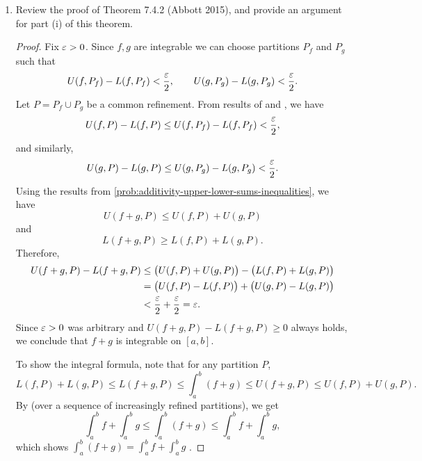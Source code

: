 \begin{problem}
\begin{enumerate}[label=(\alph*)]
    \item Review the proof of Theorem 7.4.2 (Abbott 2015), and provide an argument for part (i) of this theorem.
      
      \begin{proof}
        Fix $\varepsilon > 0$. Since $f, g$ are integrable we can choose partitions $P_{f}$ and $P_{g}$ such that
        \[
          U(f,P_{f})-L(f,P_{f})<\frac{\varepsilon}{2}, \qquad U(g,P_{g})-L(g,P_{g})<\frac{\varepsilon}{2}.
        \]
        Let $P = P_{f} \cup P_{g}$ be a common refinement. From results of
         and , we have
        \[
          U(f,P) - L(f,P) \leq U(f,P_f) - L(f,P_f) < \frac{\varepsilon}{2}, 
        \]
        and similarly,
        \[
          U(g,P) - L(g,P) \leq U(g,P_g) - L(g,P_g) < \frac{\varepsilon}{2}.
        \]
        Using the results from \ref{prob:additivity-upper-lower-sums-inequalities}, we have
        \[
          U(f+g,P) \leq U(f,P) + U(g,P)
        \]
        and
        \[
          L(f+g,P) \geq L(f,P) + L(g,P).
        \]
        Therefore,
        \begin{align*}
          U(f+g,P) - L(f+g,P) &\leq \bigl(U(f,P) + U(g,P)\bigr) - \bigl(L(f,P) + L(g,P)\bigr) \\
          &= \bigl(U(f,P) - L(f,P)\bigr) + \bigl(U(g,P) - L(g,P)\bigr) \\
          &< \frac{\varepsilon}{2} + \frac{\varepsilon}{2} = \varepsilon.
        \end{align*}
        Since $\varepsilon > 0$ was arbitrary and $U(f+g,P) - L(f+g,P) \geq 0$ always holds, 
        we conclude that $f+g$ is integrable on $[a,b]$.
        
        To show the integral formula, note that for any partition $P$,
        \[
          L(f,P) + L(g,P) \leq L(f+g,P) \leq \int_a^b (f+g) \leq U(f+g,P) \leq U(f,P) + U(g,P).
        \]
        By  (over a sequence of increasingly refined partitions), we get
        \[
          \int_a^b f + \int_a^b g \leq \int_a^b (f+g) \leq \int_a^b f + \int_a^b g,
        \]
        which shows $\int_a^b (f+g) = \int_a^b f + \int_a^b g$ .
      \end{proof}
  \end{enumerate}
\end{problem}


